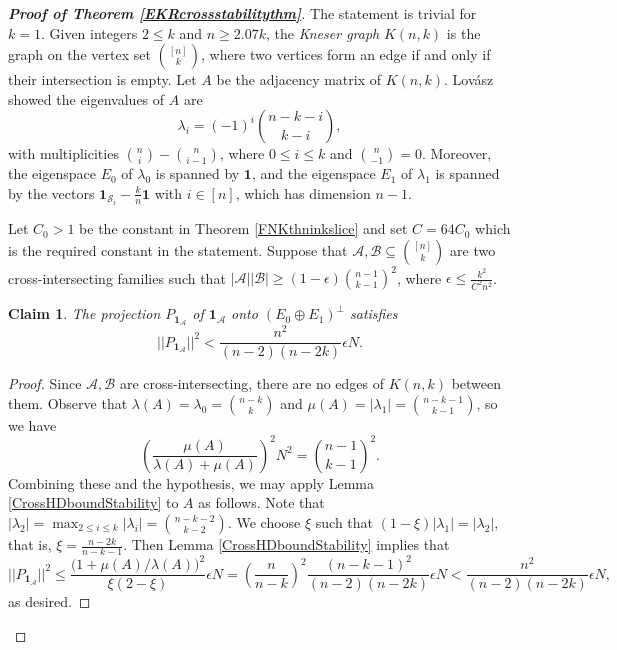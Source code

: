 \documentclass[11pt]{article}
\numberwithin{equation}{section}
\newtheorem{claim}[theorem]{Claim}
\def\A{\mathcal{A}}
\def\B{\mathcal{B}}
\def\S{\mathcal{S}}
\def\1{\mathbf{1}}
\begin{document}
\begin{proof}[{\bf Proof of Theorem \ref{EKRcrossstabilitythm}}]
The statement is trivial for $k=1$.
Given integers $2\leq  k$ and $n\geq 2.07k$,
the {\em Kneser graph} $K(n, k)$ is the graph
on the vertex set $\binom{[n]}{k}$,
where two vertices %
form an edge if and only if their intersection is empty.
Let $A$ be the adjacency matrix of $K(n,k)$.
Lov\'asz \cite{Lovasz} showed the eigenvalues of $A$ are
$$\lambda_i=(-1)^i \binom{n-k-i}{k-i},$$
with multiplicities $\binom{n}{i}-\binom{n}{i-1}$,
where $0\leq i \leq k$ and $\binom{n}{ -1}=0$.
Moreover, the eigenspace $E_0$ of $\lambda_0$ is spanned by $\1$,
and the eigenspace $E_1$ of $\lambda_1$ is spanned by the vectors
$\1_{\S_i}-\frac{k}{n}\1$ with $i\in [n]$, which has dimension $n-1$.



Let $C_0>1$ be the constant in Theorem \ref{FNKthninkslice}
and set $C=64C_0$ which is the required constant in the statement.
Suppose that $\A,\B\subseteq \binom{[n]}{k}$ are two cross-intersecting families such that $|\A||\B|\geq (1-\epsilon)\binom{n-1}{k-1}^2$,
where $\epsilon\leq \frac{k^2}{C^2n^2}$.



\begin{claim}\label{claimprojectionsmall}
The projection $P_{\1_\A}$ of $\1_\A$ onto $(E_0\oplus E_1)^{\bot}$
satisfies
$$||P_{\1_\A}||^2 < \frac{n^2}{ (n-2 )(n-2k )}\epsilon N.$$
\end{claim}
\begin{proof}
Since $\A,\B$ are cross-intersecting,
there are no edges of $K(n, k)$ between them.
Observe that $\lambda(A)=\lambda_0=\binom{n-k }{k}$ and
$\mu(A)=|\lambda_1|= \binom{n-k-1}{k-1}$,
so we have
$$ \left(\frac{\mu (A)}{\lambda (A)+\mu (A)}\right)^2N^2=\binom{n-1}{k-1}^2.$$
Combining these and the hypothesis,
we may apply Lemma \ref{CrossHDboundStability} to $A$ as follows.
Note that
$|\lambda_2|=\max_{2\leq i\leq k} |\lambda_i|=\binom{n-k-2}{k-2}$.
We choose $\xi$ such that $(1-\xi)|\lambda_1|= |\lambda_2|,$ that is, $\xi=\frac{ n-2k }{n-k-1}$.
Then Lemma \ref{CrossHDboundStability} implies that
$$||P_{\1_\A}||^2 \leq \frac{\big(1 +  \mu(A)/ \lambda(A) \big)^2 }
{ \xi(2-\xi) } \epsilon N
=\left(\frac{n}{n-k}\right)^2 \frac{(n-k-1)^2}{(n-2)(n-2k)} \epsilon N
< \frac{n^2}{ (n-2 )(n-2k )}\epsilon N,$$
as desired.
\end{proof}






\end{proof}
\end{document}
